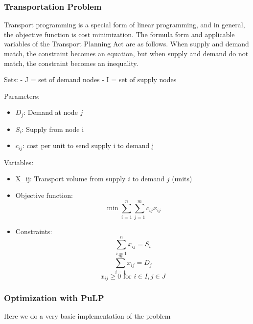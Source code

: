 

\hypertarget{transportation-problem}{%
\subsubsection{Transportation Problem}\label{transportation-problem}}

Transport programming is a special form of linear programming, and in
general, the objective function is cost minimization. The formula form
and applicable variables of the Transport Planning Act are as follows.
When supply and demand match, the constraint becomes an equation, but
when supply and demand do not match, the constraint becomes an
inequality.

Sets: - J = set of demand nodes - I = set of supply nodes

Parameters: 
\begin{itemize}
\item  $D_j$: Demand at node $j$ 
\item  $S_i$: Supply from node i 
\item  $c_{ij}$:
cost per unit to send supply i to demand j
\end{itemize}

Variables: 
\begin{itemize}
\item  X\_ij: Transport volume from supply \(i\) to demand \(j\)
(units)
\end{itemize}

\begin{itemize}
\item
  Objective function: \[\min \sum_{i=1}^n\sum_{j=1}^mc_{ij}x_{ij}\]
\item
  Constraints:
  \[\sum_{i=1}^nx_{ij}=S_i\]
  \[\sum_{i=1}^mx_{ij}=D_j\]
 \[ x_{ij}\geq 0 \text{ for } i \in I, j \in J\]
\end{itemize}

    \hypertarget{optimization-with-pulp}{%
\subsubsection{Optimization with PuLP}\label{optimization-with-pulp}}

Here we do a very basic implementation of the problem

